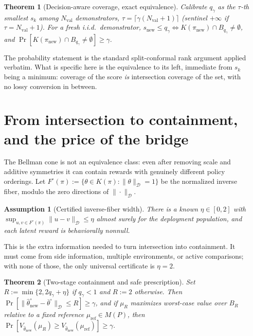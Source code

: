 \documentclass{article}
\newtheorem{theorem}{Theorem}
\newtheorem{assumption}{Assumption}
\newcommand{\Dnorm}[1]{\|#1\|_{\mathcal D}}
\begin{document}
\begin{theorem}[Decision-aware coverage, exact equivalence]
\label{thm:da-coverage}
Calibrate $q_\gamma$ as the $\tau$-th smallest $s_k$ among $N_{\mathrm{val}}$
demonstrators, $\tau=\lceil\gamma(N_{\mathrm{val}}+1)\rceil$ (sentinel $+\infty$
if $\tau=N_{\mathrm{val}}+1$). For a fresh i.i.d.\ demonstrator,
$s_{\mathrm{new}}\le q_\gamma\iff K(\pi_{\mathrm{new}})\cap
B_{q_\gamma}\ne\emptyset$, and
$\Pr[K(\pi_{\mathrm{new}})\cap B_{q_\gamma}\ne\emptyset]\ge\gamma$.
\end{theorem}

The probability statement is the standard split-conformal rank argument
\citep{vovk2005algorithmic} applied verbatim. What is specific here is the
equivalence to its left, immediate from $s_k$ being a minimum: coverage of the
score \emph{is} intersection coverage of the set, with no lossy conversion in
between.

\section{From intersection to containment, and the price of the bridge}
\label{sec:bridge}

The Bellman cone is not an equivalence class: even after removing scale and
additive symmetries it can contain rewards with genuinely different policy
orderings. Let $F^\circ(\pi):=\{\theta\in K(\pi):\Dnorm{\theta}=1\}$ be the
normalized inverse fiber, modulo the zero directions of $\Dnorm{\cdot}$.

\begin{assumption}[Certified inverse-fiber width]
\label{ass:fiber-width}
There is a known $\eta\in[0,2]$ with
$\sup_{u,v\in F^\circ(\pi)}\Dnorm{u-v}\le\eta$ almost surely for the deployment
population, and each latent reward is behaviorally nonnull.
\end{assumption}

This is the extra information needed to turn intersection into containment. It
must come from side information, multiple environments, or active comparisons;
with none of those, the only universal certificate is $\eta=2$.

\begin{theorem}[Two-stage containment and safe prescription]
\label{thm:containment}
Set $R:=\min\{2,2q_\gamma+\eta\}$ if $q_\gamma<1$ and $R:=2$ otherwise. Then
$\Pr[\Dnorm{\hat\theta_{\mathrm{new}}^\circ-\bar\theta^\circ}\le R]\ge\gamma$,
and if $\mu_R$ maximizes worst-case value over $B_R$ relative to a fixed
reference $\mu_{\mathrm{ref}}\in M(P)$, then
$\Pr[V_{\hat\theta_{\mathrm{new}}}(\mu_R)\ge
V_{\hat\theta_{\mathrm{new}}}(\mu_{\mathrm{ref}})]\ge\gamma$.
\end{theorem}
\end{document}
